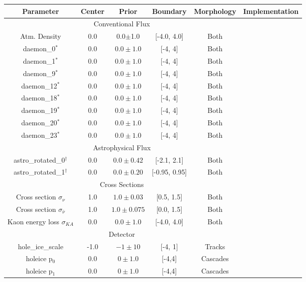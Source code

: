 \documentclass[main.tex]{subfiles}
\begin{document}
\begin{table}
    \centering
    \begin{tabular}{c | ccccc}\rowcolor{blue!25}
        {\large \textbf{Parameter}} & {\large \textbf{Center}} & {\large \textbf{Prior}} & {\large \textbf{Boundary}}& {\large \textbf{Morphology}} & {\large \textbf{Implementation}}\\ \hline
        \multicolumn{5}{c}{Conventional Flux} \\\hline
        Atm. Density & 0.0 & 0.0$\pm$1.0 & [-4.0, 4.0] & Both & \\
        daemon\_0$^{*}$  & 0.0 & $0.0\pm1.0$ & [-4, 4]& Both & \\
        daemon\_1$^{*}$  & 0.0 & $0.0\pm1.0$ & [-4, 4]& Both &  \\
        daemon\_9$^{*}$  & 0.0 & $0.0\pm1.0$ & [-4, 4]& Both & \\
        daemon\_12$^{*}$  & 0.0 & $0.0\pm1.0$ & [-4, 4]& Both & \\
        daemon\_18$^{*}$ & 0.0 & $0.0\pm1.0$ & [-4, 4]& Both & \\
        daemon\_19$^{*}$ & 0.0 & $0.0\pm1.0$ & [-4, 4]& Both & \\
        daemon\_20$^{*}$ & 0.0 & $0.0\pm1.0$ & [-4, 4]& Both & \\
        daemon\_23$^{*}$ & 0.0 & $0.0\pm1.0$ & [-4, 4]& Both & \\
        \multicolumn{5}{c}{Astrophysical Flux} \\\hline
        astro\_rotated\_0$^{\dag}$ & 0.0 & $0.0\pm 0.42 $ & [-2.1, 2.1]&Both & \\
        astro\_rotated\_1$^{\dag}$ & 0.0 & $0.0\pm0.20$ & [-0.95, 0.95]&Both & \\
        \multicolumn{5}{c}{Cross Sections} \\\hline
        Cross section $\sigma_{\nu}$ & 1.0 & $1.0\pm0.03$ & [0.5, 1.5]& Both & \\
        Cross section $\sigma_{\bar{\nu}}$ & 1.0 & $1.0\pm0.075$ & [0.0, 1.5]& Both &  \\
        Kaon energy loss $\sigma_{KA}$ & 0.0 & $0.0\pm1.0$ & [-4.0, 4.0]& Both & \\
        \multicolumn{5}{c}{Detector} \\\hline 
        hole\_ice\_scale & -1.0 & $-1\pm10$ & [-4, 1]&Tracks & \\
        holeice p$_{0}$ & 0.0 & $0\pm 1.0$ & [-4,4]&Cascades & \\
        holeice p$_{1}$ & 0.0 & $0\pm 1.0$ & [-4,4]&Cascades & \\

\end{tabular}
\end{table}
\end{document}
